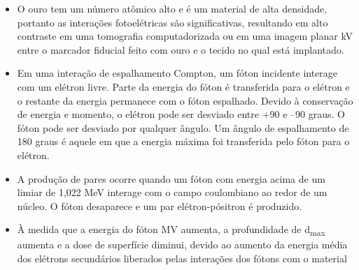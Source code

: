 \documentclass[11pt,a4paper]{article}
\newcounter{exemplo}
\begin{document}
\begin{exemplo}[Física]
\begin{itemize}
        \item O ouro tem um número atômico alto e é um material de alta densidade, portanto as interações fotoelétricas são significativas, resultando em alto contraste em uma tomografia computadorizada ou em uma imagem planar kV entre o marcador fiducial feito com ouro e o tecido no qual está implantado.
        
        \item Em uma interação de espalhamento Compton, um fóton incidente interage com um elétron livre. Parte da energia do fóton é transferida para o elétron e o restante da energia permanece com o fóton espalhado. Devido à conservação de energia e momento, o elétron pode ser desviado entre +90 e –90 graus. O fóton pode ser desviado por qualquer ângulo. Um ângulo de espalhamento de 180 graus é aquele em que a energia máxima foi transferida pelo fóton para o elétron.
        
        \item A produção de pares ocorre quando um fóton com energia acima de um limiar de 1,022 MeV interage com o campo coulombiano ao redor de um núcleo. O fóton desaparece e um par elétron-pósitron é produzido.
        
        \item À medida que a energia do fóton MV aumenta, a profundidade de d\textsubscript{max} aumenta e a dose de superfície diminui, devido ao aumento da energia média dos elétrons secundários liberados pelas interações dos fótons com o material

    \end{itemize}

\end{exemplo}
\end{document}
